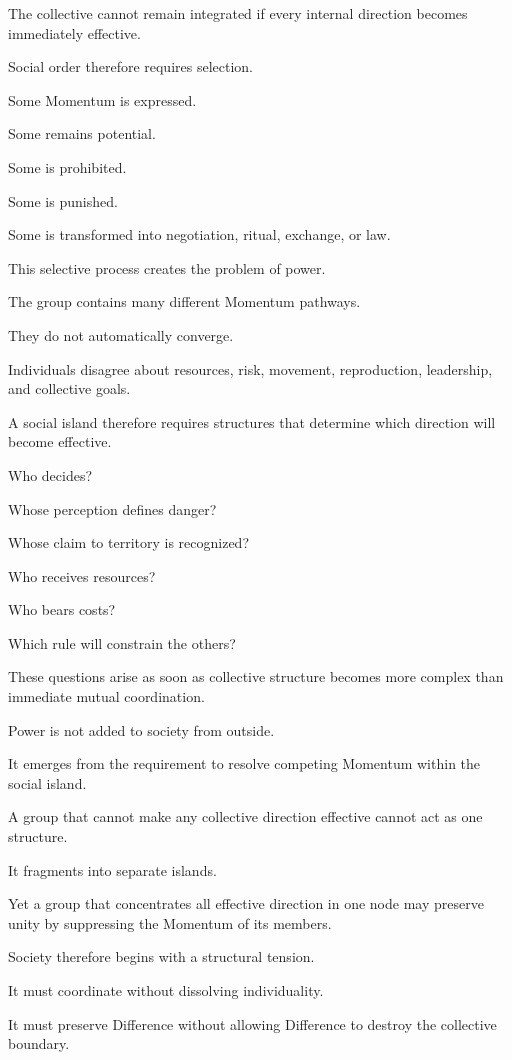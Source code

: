 The collective cannot remain integrated if every internal direction becomes immediately effective.

Social order therefore requires selection.

Some Momentum is expressed.

Some remains potential.

Some is prohibited.

Some is punished.

Some is transformed into negotiation, ritual, exchange, or law.

This selective process creates the problem of power.

The group contains many different Momentum pathways.

They do not automatically converge.

Individuals disagree about resources, risk, movement, reproduction, leadership, and collective goals.

A social island therefore requires structures that determine which direction will become effective.

Who decides?

Whose perception defines danger?

Whose claim to territory is recognized?

Who receives resources?

Who bears costs?

Which rule will constrain the others?

These questions arise as soon as collective structure becomes more complex than immediate mutual coordination.

Power is not added to society from outside.

It emerges from the requirement to resolve competing Momentum within the social island.

A group that cannot make any collective direction effective cannot act as one structure.

It fragments into separate islands.

Yet a group that concentrates all effective direction in one node may preserve unity by suppressing the Momentum of its members.

Society therefore begins with a structural tension.

It must coordinate without dissolving individuality.

It must preserve Difference without allowing Difference to destroy the collective boundary.

